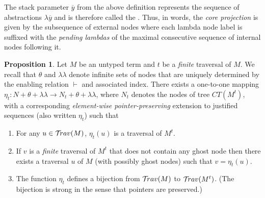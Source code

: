 \documentclass{article}
\theoremstyle{definition}
\newtheorem{proposition}{Proposition}[section]
\newcommand\Nodes{N}%
\newcommand{\ghostlmd}{{\lambda\!\!\lambda}}
\newcommand{\ghostvar}{\theta}
\newcommand{\travulc}{\travset}
\newcommand{\enables}{\vdash} %
\begin{document}
The stack parameter $\overline{y}$ from the above definition represents the sequence of abstractions $\lambda \overline{y}$ and is therefore called the . Thus, in words, the \emph{core projection} is given by the subsequence of external nodes where each lambda node label is suffixed with the \emph{pending lambdas} of the maximal consecutive sequence of internal nodes following it.

\begin{proposition}
\label{prop:eta_expanded_trav}
Let $M$ be an untyped term and $t$ be a \emph{finite} traversal of $M$.
We recall that $\ghostvar$ and $\ghostlmd$ denote infinite sets of nodes that are uniquely determined by the enabling relation $\enables$ and associated index. There exists a one-to-one mapping
  $\eta_t : \Nodes + \ghostvar + \ghostlmd \longrightarrow \Nodes_t + \ghostvar + \ghostlmd$, where $\Nodes_t$ denotes the nodes of tree $CT(M^t)$, with a corresponding \emph{element-wise pointer-preserving} extension to justified sequences (also written $\eta_t$) such that
\begin{enumerate}[label=(\roman*)]
  \item For any $u \in \travulc(M)$, $\eta_t(u)$ is a traversal of $M^t$.

  \item If $v$ is a \emph{finite} traversal of $M^t$ that does not contain any ghost node then there exists a traversal $u$ of $M$ (with possibly ghost nodes) such that $v = \eta_t(u)$.

  \item The function $\eta_t$ defines a bijection from $\mathcal{T}\!rav(M)$ to $\mathcal{T}\!rav(M^t)$. (The bijection is strong in the sense that pointers are preserved.)
\end{enumerate}
\end{proposition}
\end{document}
